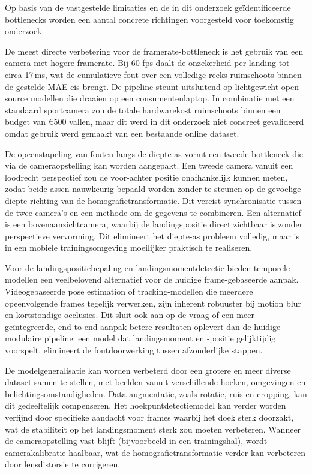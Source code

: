 Op basis van de vastgestelde limitaties en de in dit onderzoek geïdentificeerde bottlenecks worden een aantal concrete richtingen voorgesteld voor toekomstig onderzoek.

De meest directe verbetering voor de framerate-bottleneck is het gebruik van een camera met hogere framerate. Bij 60 fps daalt de onzekerheid per landing tot circa 17\,ms, wat de cumulatieve fout over een volledige reeks ruimschoots binnen de gestelde MAE-eis brengt. De pipeline steunt uitsluitend op lichtgewicht open-source modellen die draaien op een consumentenlaptop. In combinatie met een standaard sportcamera zou de totale hardwarekost ruimschoots binnen een budget van \euro{}500 vallen, maar dit werd in dit onderzoek niet concreet gevalideerd omdat gebruik werd gemaakt van een bestaande online dataset.

De opeenstapeling van fouten langs de diepte-as vormt een tweede bottleneck die via de cameraopstelling kan worden aangepakt. Een tweede camera vanuit een loodrecht perspectief zou de voor-achter positie onafhankelijk kunnen meten, zodat beide assen nauwkeurig bepaald worden zonder te steunen op de gevoelige diepte-richting van de homografietransformatie. Dit vereist synchronisatie tussen de twee camera's en een methode om de gegevens te combineren. Een alternatief is een bovenaanzichtcamera, waarbij de landingspositie direct zichtbaar is zonder perspectieve vervorming. Dit elimineert het diepte-as probleem volledig, maar is in een mobiele trainingsomgeving moeilijker praktisch te realiseren.

Voor de landingspositiebepaling en landingsmomentdetectie bieden temporele modellen een veelbelovend alternatief voor de huidige frame-gebaseerde aanpak. Videogebaseerde pose estimation of tracking-modellen die meerdere opeenvolgende frames tegelijk verwerken, zijn inherent robuuster bij motion blur en kortstondige occlusies. Dit sluit ook aan op de vraag of een meer geïntegreerde, end-to-end aanpak betere resultaten oplevert dan de huidige modulaire pipeline: een model dat landingsmoment en -positie gelijktijdig voorspelt, elimineert de foutdoorwerking tussen afzonderlijke stappen.

De modelgeneralisatie kan worden verbeterd door een grotere en meer diverse dataset samen te stellen, met beelden vanuit verschillende hoeken, omgevingen en belichtingsomstandigheden. Data-augmentatie, zoals rotatie, ruis en cropping, kan dit gedeeltelijk compenseren. Het hoekpuntdetectiemodel kan verder worden verfijnd door specifieke aandacht voor frames waarbij het doek sterk doorzakt, wat de stabiliteit op het landingsmoment sterk zou moeten verbeteren. Wanneer de cameraopstelling vast blijft (bijvoorbeeld in een trainingshal), wordt camerakalibratie haalbaar, wat de homografietransformatie verder kan verbeteren door lensdistorsie te corrigeren.

